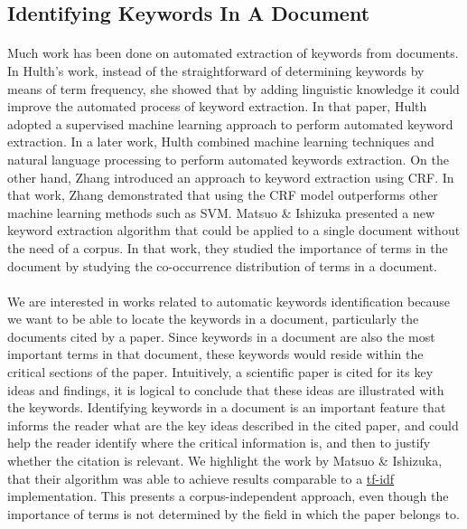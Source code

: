 \documentclass[12 pt]{article}
\begin{document}
\subsection{Identifying Keywords In A Document}
\paragraph{}
Much work has been done on automated extraction of keywords from documents. In Hulth\cite{keywordextraction_ml}'s work, instead of the straightforward of determining keywords by means of term frequency, she showed that by adding linguistic knowledge it could improve the automated process of keyword extraction. In that paper, Hulth adopted a supervised machine learning approach to perform automated keyword extraction. In a later work, Hulth\cite{keywordextraction_mlnlp} combined machine learning techniques and natural language processing to perform automated keywords extraction. On the other hand, Zhang\cite{keywordextraction_crf} introduced an approach to keyword extraction using CRF. In that work, Zhang demonstrated that using the CRF model outperforms other machine learning methods such as SVM. Matsuo \& Ishizuka\cite{keywordextraction_corpusfree} presented a new keyword extraction algorithm that could be applied to a single document without the need of a corpus. In that work, they studied the importance of terms in the document by studying the co-occurrence distribution of terms in a document.

\paragraph{}
We are interested in works related to automatic keywords identification because we want to be able to locate the keywords in a document, particularly the documents cited by a paper. Since keywords in a document are also the most important terms in that document, these keywords would reside within the critical sections of the paper. Intuitively, a scientific paper is cited for its key ideas and findings, it is logical to conclude that these ideas are illustrated with the keywords. Identifying keywords in a document is an important feature that informs the reader what are the key ideas described in the cited paper, and could help the reader identify where the critical information is, and then to justify whether the citation is relevant. We highlight the work by Matsuo \& Ishizuka, that their algorithm was able to achieve results comparable to a \url{tf-idf}\cite{irtextbook} implementation. This presents a corpus-independent approach, even though the importance of terms is not determined by the field in which the paper belongs to.
\end{document}
